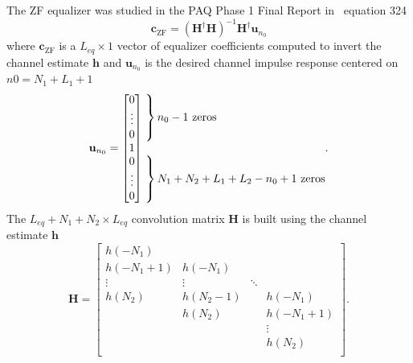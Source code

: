 The ZF equalizer was studied in the PAQ Phase 1 Final Report in ~equation 324
\begin{equation}
\mathbf{c}_\text{ZF} = (\mathbf{H}^\dagger \mathbf{H})^{-1} \mathbf{H}^\dagger \mathbf{u}_{n_0}
\label{eq:c_ZF_pinv}
\end{equation}
where $\mathbf{c}_\text{ZF}$ is a $L_{eq} \times 1$ vector of equalizer coefficients computed to invert the channel estimate $\mathbf{h}$
and $\mathbf{u}_{n_0}$ is the desired channel impulse response centered on $n0 = N_1+L_1+1$
\begin{equation}
\mathbf{u}_{n_0} = \begin{bmatrix} 0 \\ \vdots \\ 0 \\ 1 \\ 0 \\ \vdots \\ 0 \end{bmatrix}
	\begin{matrix*}[l] \left. \vphantom{\begin{matrix} 0 \\ \vdots \\ 0 \end{matrix}} \right\}
		\text{$n_0-1$ zeros}
		\\ \\
		\left. \vphantom{\begin{matrix} 0 \\ \vdots \\ 0 \end{matrix}} \right\}
		\text{$N_1+N_2+L_1+L_2-n_0+1$ zeros}
		\end{matrix*}.
		\label{eq:un0_ZF}
\end{equation}
The $L_{eq}+N_1+N_2 \times L_{eq}$ convolution matrix $\mathbf{H}$ is built using the channel estimate $\mathbf{h}$
\begin{equation}
\mathbf{H} = 
		\begin{bmatrix}
		h(-N_1)		&  			& 		 	&  			\\
		h(-N_1+1) 	& h(-N_1)	& 		 	&  			\\
		\vdots	 	& \vdots	& \ddots 	&  			\\
		h(N_2)		& h(N_2-1) 	&  			& h(-N_1)  	\\
		 			& h(N_2) 	&  			& h(-N_1+1) \\
		 			&  	   		&  			& \vdots	\\
		 			&  	   		&  			& h(N_2)	\\
	\end{bmatrix}.
\end{equation}
